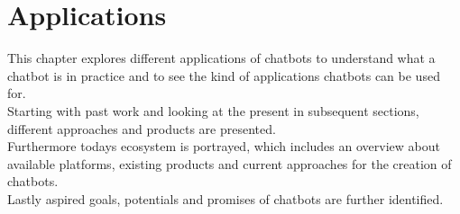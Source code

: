 \chapter{Applications}


This chapter explores different applications of chatbots
to understand what a chatbot is in practice and to see the kind of applications chatbots can be used for.
\\
Starting with past work and looking at the present in subsequent sections,
different approaches and products are presented.
\\
Furthermore todays ecosystem is portrayed,
which includes an overview about available platforms,
existing products
and current approaches for the creation of chatbots.
\\
Lastly aspired goals, potentials and promises of chatbots are further identified.
